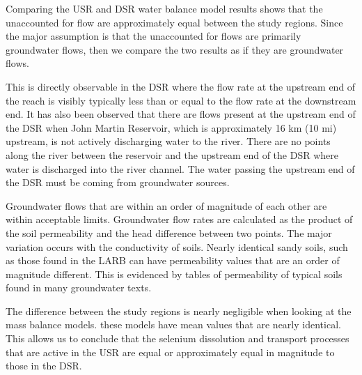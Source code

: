 Comparing the USR and DSR water balance model results shows that the unaccounted for flow are approximately equal between the study regions.  Since the major assumption is that the unaccounted for flows are primarily groundwater flows, then we compare the two results as if they are groundwater flows.  

This is directly observable in the DSR where the flow rate at the upstream end of the reach is visibly typically less than or equal to the flow rate at the downstream end.  It has also been observed that there are flows present at the upstream end of the DSR when John Martin Reservoir, which is approximately 16 km (10 mi) upstream, is not actively discharging water to the river.  There are no points along the river between the reservoir and the upstream end of the DSR where water is discharged into the river channel.  The water passing the upstream end of the DSR must be coming from groundwater sources.

Groundwater flows that are within an order of magnitude of each other are within acceptable limits.  Groundwater flow rates are calculated as the product of the soil permeability and the head difference between two points.  The major variation occurs with the conductivity of soils.  Nearly identical sandy soils, such as those found in the LARB can have permeability values that are an order of magnitude different.  This is evidenced by tables of permeability of typical soils found in many groundwater texts.

The difference between the study regions is nearly negligible when looking at the mass balance models.  these models have mean values that are nearly identical.  This allows us to conclude that the selenium dissolution and transport processes that are active in the USR are equal or approximately equal in magnitude to those in the DSR.

\clearpage{}